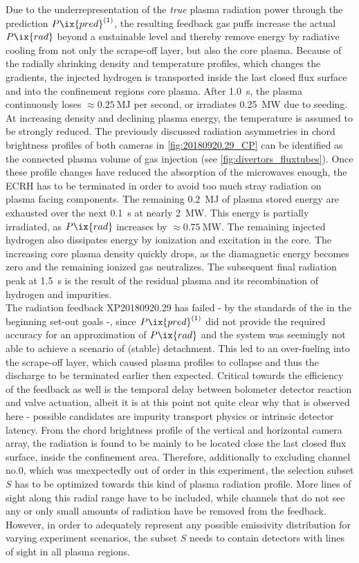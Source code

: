             Due to the underrepresentation of the \textit{true} plasma radiation power through the prediction $P\ix{pred}^{\left(1\right)}$, the resulting feedback gas puffs increase the actual $P\ix{rad}$ beyond a sustainable level and thereby remove energy by radiative cooling from not only the scrape-off layer, but also the core plasma. Because of the radially shrinking density and temperature profiles, which changes the gradients, the injected hydrogen is transported inside the last closed flux surface and into the confinement regions core plasma. After \SI{1.0}{\second}, the plasma continuously loses $\approx\SI{0.25}{\mega\joule}$ per second, or irradiates \SI{0.25}{\mega\watt} due to seeding. At increasing density and declining plasma energy, the temperature is assumed to be strongly reduced. The previously discussed radiation asymmetries in chord brightness profiles of both cameras in \cref{fig:20180920.29_CP} can be identified as the connected plasma volume of gas injection (see \cref{fig:divertors_fluxtubes}). Once these profile changes have reduced the absorption of the microwaves enough, the ECRH has to be terminated in order to avoid too much stray radiation on plasma facing components. The remaining \SI{0.2}{\mega\joule} of plasma stored energy are exhausted over the next \SI{0.1}{\second} at nearly \SI{2}{\mega\watt}. This energy is partially irradiated, as $P\ix{rad}$ increases by $\approx\SI{0.75}{\mega\watt}$. The remaining injected hydrogen also dissipates energy by ionization and excitation in the core. The increasing core plasma density quickly drops, as the diamagnetic energy becomes zero and the remaining ionized gas neutralizes. The subsequent final radiation peak at \SI{1.5}{\second} is the result of the residual plasma and its recombination of hydrogen and impurities.\\%
            The radiation feedback XP20180920.29 has failed - by the standards of the in the beginning set-out goals -, since $P\ix{pred}^{\left(1\right)}$ did not provide the required accuracy for an approximation of $P\ix{rad}$ and the system was seemingly not able to achieve a scenario of (stable) detachment. This led to an over-fueling into the scrape-off layer, which caused plasma profiles to collapse and thus the discharge to be terminated earlier then expected. Critical towards the efficiency of the feedback as well is the temporal delay between bolometer detector reaction and valve actuation, albeit it is at this point not quite clear why that is observed here - possible candidates are impurity transport physics or intrinsic detector latency. From the chord brightness profile of the vertical and horizontal camera array, the radiation is found to be mainly to be located close the last closed flux surface, inside the confinement area. Therefore, additionally to excluding channel no.0, which was unexpectedly out of order in this experiment, the selection subset $S$ has to be optimized towards this kind of plasma radiation profile. More lines of sight along this radial range have to be included, while channels that do not see any or only small amounts of radiation have be removed from the feedback. However, in order to adequately represent any possible emissivity distribution for varying experiment scenarios, the subset $S$ needs to contain detectors with lines of sight in all plasma regions.%
%
